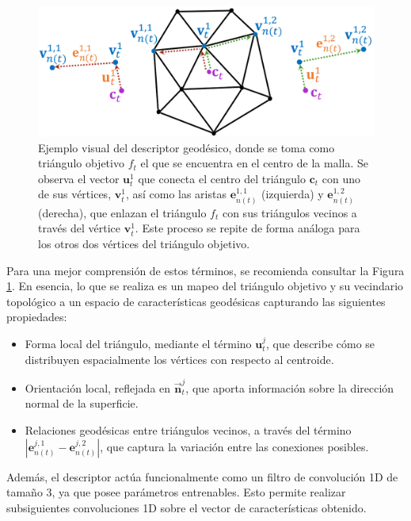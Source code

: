 \begin{figure}
    \centering
    \includegraphics[width=\linewidth]{figures/4_materials-methods/geodesic_descriptor.png}
    \caption[Ejemplo visual del descriptor geodésico]{Ejemplo visual del descriptor geodésico, donde se toma como triángulo objetivo $f_t$ el que se encuentra en el centro de la malla. Se observa el vector $\textbf{u}_{t}^{1}$ que conecta el centro del triángulo $\textbf{c}_t$ con uno de sus vértices, $\textbf{v}_t^1$, así como las aristas $\textbf{e}_{n(t)}^{1,1}$ (izquierda) y $\textbf{e}_{n(t)}^{1,2}$ (derecha), que enlazan el triángulo $f_t$ con sus triángulos vecinos a través del vértice $\textbf{v}_t^1$. Este proceso se repite de forma análoga para los otros dos vértices del triángulo objetivo.}
    \label{geod_descrp}
\end{figure}

Para una mejor comprensión de estos términos, se recomienda consultar la Figura \ref{geod_descrp}. En esencia, lo que se realiza es un mapeo del triángulo objetivo y su vecindario topológico a un espacio de características geodésicas capturando las siguientes propiedades:
\begin{itemize}
    \item Forma local del triángulo, mediante el término $\textbf{u}_{t}^{j}$, que describe cómo se distribuyen espacialmente los vértices con respecto al centroide.
    \item Orientación local, reflejada en $\overrightarrow{\textbf{n}}_{t}^{j}$, que aporta información sobre la dirección normal de la superficie.
    \item Relaciones geodésicas entre triángulos vecinos, a través del término $|\textbf{e}_{n(t)}^{j,1} - \textbf{e}_{n(t)}^{j,2}|$, que captura la variación entre las conexiones posibles.
\end{itemize}

Además, el descriptor actúa funcionalmente como un filtro de convolución 1D de tamaño 3, ya que posee parámetros entrenables. Esto permite realizar subsiguientes convoluciones 1D sobre el vector de características obtenido.

